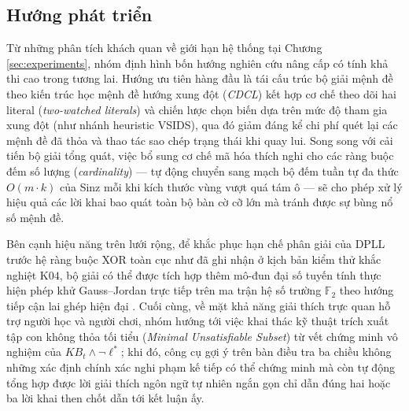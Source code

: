 \subsection{Hướng phát triển}
Từ những phân tích khách quan về giới hạn hệ thống tại Chương
\ref{sec:experiments}, nhóm định hình bốn hướng nghiên cứu nâng cấp có tính khả thi
cao trong tương lai. Hướng ưu tiên hàng đầu là tái cấu trúc bộ giải mệnh đề theo
kiến trúc học mệnh đề hướng xung đột (\textit{CDCL}) kết hợp cơ chế theo dõi hai
literal (\textit{two-watched literals}) \cite{silva1999grasp,moskewicz2001chaff} và
chiến lược chọn biến dựa trên mức độ tham gia xung đột (như nhánh heuristic VSIDS),
qua đó giảm đáng kể chi phí quét lại các mệnh đề đã thỏa và thao tác sao chép trạng
thái khi quay lui. Song song với cải tiến bộ giải tổng quát, việc bổ sung cơ chế mã
hóa thích nghi cho các ràng buộc đếm số lượng (\textit{cardinality}) --- tự động
chuyển sang mạch bộ đếm tuần tự đa thức $O(m \cdot k)$ của Sinz
\cite{sinz2005towards} mỗi khi kích thước vùng vượt quá tám ô --- sẽ cho phép xử
lý hiệu quả các lời khai bao quát toàn bộ bàn cờ cỡ lớn mà tránh được sự bùng nổ
số mệnh đề.

Bên cạnh hiệu năng trên lưới rộng, để khắc phục hạn chế phân giải của DPLL trước hệ
ràng buộc XOR toàn cục như đã ghi nhận ở kịch bản kiểm thử khắc nghiệt $\text{K04}$,
bộ giải có thể được tích hợp thêm mô-đun đại số tuyến tính thực hiện phép khử
Gauss--Jordan trực tiếp trên ma trận hệ số trường $\mathbb{F}_2$ theo hướng tiếp
cận lai ghép hiện đại \cite{soos2009extending}. Cuối cùng, về mặt khả năng giải
thích trực quan hỗ trợ người học và người chơi, nhóm hướng tới việc khai thác kỹ
thuật trích xuất tập con không thỏa tối tiểu (\textit{Minimal Unsatisfiable
Subset}) từ vết chứng minh vô nghiệm của $KB_t \wedge \neg \ell^*$; khi đó, công cụ
gợi ý trên bàn điều tra ba chiều không những xác định chính xác nghi phạm kế tiếp
có thể chứng minh mà còn tự động tổng hợp được lời giải thích ngôn ngữ tự nhiên
ngắn gọn chỉ dẫn đúng hai hoặc ba lời khai then chốt dẫn tới kết luận ấy.
